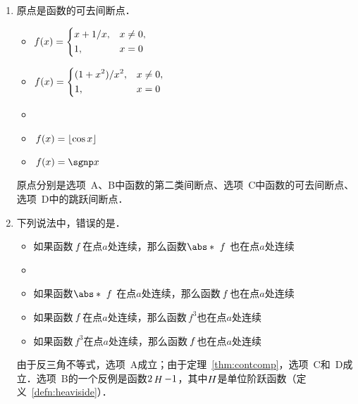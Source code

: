 \begin{enumerate}
\item 原点是函数\uline{\makebox[6em]{}}的可去间断点．
  \begin{itemize}
    \renewcommand{\labelitemi}{\faCircleThin}
  \item
    \begin{math}
      f(x) =
      \begin{dcases}
        x + 1/x, & x \ne 0, \\
        1, & x = 0
      \end{dcases}
    \end{math}
  \item
    \begin{math}
      f(x) =
      \begin{dcases}
        (1+x^2)/x^2, & x \ne 0, \\
        1, & x = 0
      \end{dcases}
    \end{math}
    \ifshowsol
    \item[\faCircle]
    \else
    \item
    \fi
    \(\,f(x) = \lfloor\cos x\rfloor\)
  \item \(\,f(x) = \sgnp x\)
  \end{itemize}

  \ifshowsol
    原点分别是选项~A、B中函数的第二类间断点、选项~C中函数的可去间断点、选项~D中的跳跃间断点．
  \fi

\item 下列说法中，错误的是\uline{\makebox[10em]{}}．
  \begin{itemize}
    \renewcommand{\labelitemi}{\faCircleThin}
  \item 如果函数\(\,f\mkern2mu\)在点\(a\)处连续，那么函数\(\abs*{\mkern6mu f\ }\)也在点\(a\)处连续
    \ifshowsol
    \item[\faCircle]
    \else
    \item
    \fi
    如果函数\(\abs*{\mkern6mu f\ }\)在点\(a\)处连续，那么函数\(\,f\mkern2mu\)也在点\(a\)处连续
  \item 如果函数\(\,f\mkern2mu\)在点\(a\)处连续，那么函数\(\,f^3\!\)也在点\(a\)处连续
  \item 如果函数\(\,f^3\!\)在点\(a\)处连续，那么函数\(\,f\mkern2mu\)也在点\(a\)处连续
  \end{itemize}

  \ifshowsol
    由于反三角不等式，选项~A成立；由于定理~\ref{thm:contcomp}，选项~C和~D成立．选项~B的一个反例是函数\(2\mathop{\relax H}\nolimits - 1\)，其中\(\mathop{\relax H}\nolimits\)是单位阶跃函数（定义~\ref{defn:heaviside}）．
  \fi


\end{enumerate}
